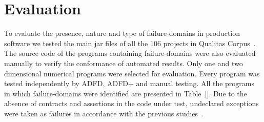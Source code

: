 \documentclass[runningheads,a4paper]{llncs}
\begin{document}



\section{Evaluation} \label{sec:evaluation}
To evaluate the presence, nature and type of failure-domains in production software we tested the main jar files of all the 106 projects in Qualitas Corpus~\cite{}. The source code of the programs containing failure-domains were also evaluated manually to verify the conformance of automated results. Only one and two dimensional numerical programs were selected for evaluation. Every program was tested independently by ADFD, ADFD+ and manual testing. All the programs in which failure-domains were identified are presented in Table~\ref{}.  Due to the absence of contracts and assertions in the code under test, undeclared exceptions were taken as failures in accordance with the previous studies~\cite{ahmad2013adfd, Oriol2012}.
\end{document}
